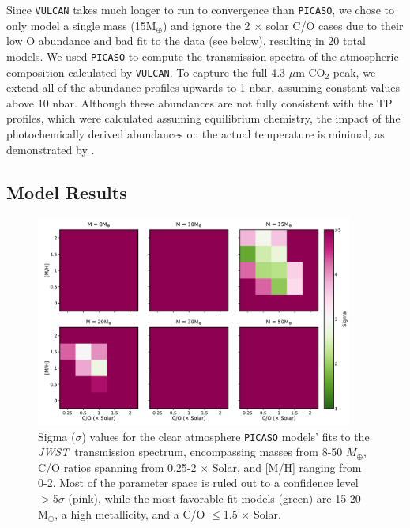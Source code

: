 \documentclass[twocolumn]{aastex63} %
\newcommand{\jwst}{\textit{JWST}}
\begin{document}
Since \texttt{VULCAN} takes much longer to run to convergence than \texttt{PICASO}, we chose to only model a single mass (15M$_{\oplus}$) and ignore the 2 $\times$ solar C/O cases due to their low O abundance and bad fit to the data (see below), resulting in 20 total models. We used \texttt{PICASO} to compute the transmission spectra of the atmospheric composition calculated by \texttt{VULCAN}. To capture the full 4.3 $\mu$m CO$_2$ peak, we extend all of the abundance profiles upwards to 1 nbar, assuming constant values above 10 nbar. Although these abundances are not fully consistent with the TP profiles, which were calculated assuming equilibrium chemistry, the impact of the photochemically derived abundances on the actual temperature is minimal, as demonstrated by \citet{Tsai2023}. 

\subsection{Model Results}

\begin{figure}[ht]
    \centering
    \includegraphics[width=0.93\textwidth]{fig_sigma_hip67522b_newdata_60k_NoOutlier.pdf}
    \caption{Sigma ($\sigma$) values for the clear atmosphere \texttt{PICASO} models' fits to the \jwst\, transmission spectrum, encompassing masses from 8-50 $M_{\oplus}$,  C/O ratios spanning from 0.25-2 $\times$ Solar, and [M/H] ranging from 0-2. Most of the parameter space is ruled out to a confidence level $>$5$\sigma$ (pink), while the most favorable fit models (green) are 15-20 M$_{\oplus}$, a high metallicity, and a C/O $\le$1.5 $\times$ Solar.}
    \label{fig:clear_chisq}
\end{figure}
\end{document}
